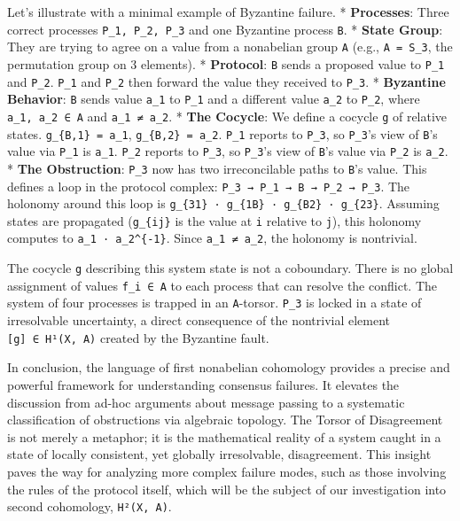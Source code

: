 \documentclass[
]{article}
\begin{document}
Let's illustrate with a minimal example of Byzantine failure. *
\textbf{Processes}: Three correct processes \texttt{P\_1,\ P\_2,\ P\_3}
and one Byzantine process \texttt{B}. * \textbf{State Group}: They are
trying to agree on a value from a nonabelian group \texttt{A} (e.g.,
\texttt{A\ =\ S\_3}, the permutation group on 3 elements). *
\textbf{Protocol}: \texttt{B} sends a proposed value to \texttt{P\_1}
and \texttt{P\_2}. \texttt{P\_1} and \texttt{P\_2} then forward the
value they received to \texttt{P\_3}. * \textbf{Byzantine Behavior}:
\texttt{B} sends value \texttt{a\_1} to \texttt{P\_1} and a different
value \texttt{a\_2} to \texttt{P\_2}, where \texttt{a\_1,\ a\_2\ ∈\ A}
and \texttt{a\_1\ ≠\ a\_2}. * \textbf{The Cocycle}: We define a cocycle
\texttt{g} of relative states. \texttt{g\_\{B,1\}\ =\ a\_1},
\texttt{g\_\{B,2\}\ =\ a\_2}. \texttt{P\_1} reports to \texttt{P\_3}, so
\texttt{P\_3}'s view of \texttt{B}'s value via \texttt{P\_1} is
\texttt{a\_1}. \texttt{P\_2} reports to \texttt{P\_3}, so
\texttt{P\_3}'s view of \texttt{B}'s value via \texttt{P\_2} is
\texttt{a\_2}. * \textbf{The Obstruction}: \texttt{P\_3} now has two
irreconcilable paths to \texttt{B}'s value. This defines a loop in the
protocol complex: \texttt{P\_3\ →\ P\_1\ →\ B\ →\ P\_2\ →\ P\_3}. The
holonomy around this loop is
\texttt{g\_\{31\}\ ·\ g\_\{1B\}\ ·\ g\_\{B2\}\ ·\ g\_\{23\}}. Assuming
states are propagated (\texttt{g\_\{ij\}} is the value at \texttt{i}
relative to \texttt{j}), this holonomy computes to
\texttt{a\_1\ ·\ a\_2\^{}\{-1\}}. Since \texttt{a\_1\ ≠\ a\_2}, the
holonomy is nontrivial.

The cocycle \texttt{g} describing this system state is not a coboundary.
There is no global assignment of values \texttt{f\_i\ ∈\ A} to each
process that can resolve the conflict. The system of four processes is
trapped in an \texttt{A}-torsor. \texttt{P\_3} is locked in a state of
irresolvable uncertainty, a direct consequence of the nontrivial element
\texttt{{[}g{]}\ ∈\ H¹(X,\ A)} created by the Byzantine fault.

In conclusion, the language of first nonabelian cohomology provides a
precise and powerful framework for understanding consensus failures. It
elevates the discussion from ad-hoc arguments about message passing to a
systematic classification of obstructions via algebraic topology. The
Torsor of Disagreement is not merely a metaphor; it is the mathematical
reality of a system caught in a state of locally consistent, yet
globally irresolvable, disagreement. This insight paves the way for
analyzing more complex failure modes, such as those involving the rules
of the protocol itself, which will be the subject of our investigation
into second cohomology, \texttt{H²(X,\ A)}.
\end{document}
